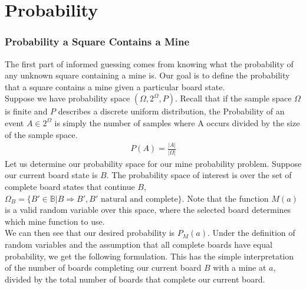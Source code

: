 \section{Probability}\label{sec:probability}

\subsubsection*{Probability a Square Contains a Mine}

The first part of informed guessing comes from knowing what the probability of any unknown square containing a mine is. Our goal is to define the probability that a square contains a mine given a particular board state.\\

Suppose we have probability space $(\Omega,2^{\Omega},P)$. Recall that if the sample space $\Omega$ is finite and $P$ describes a discrete uniform distribution, the Probability of an event $A\in2^{\Omega}$ is simply the number of samples where A occurs divided by the size of the sample space. 
\begin{align*}
    P(A)=\frac{|A|}{|\Omega|}
\end{align*}
Let us determine our probability space for our mine probability problem. Suppose our current board state is $B$. The probability space of interest is over the set of complete board states that continue $B$, $\Omega_B=\{B'\in\mathbb{B}|B\Rightarrow B',B'\text{ natural and complete}\}$. Note that the function $M(a)$ is a valid random variable over this space, where the selected board determines which mine function to use.\\

We can then see that our desired probability is $P_M(a)$. Under the definition of random variables and the assumption that all complete boards have equal probability, we get the following formulation.
This has the simple interpretation of the number of boards completing our current board $B$ with a mine at $a$, divided by the total number of boards that complete our current board.\\

